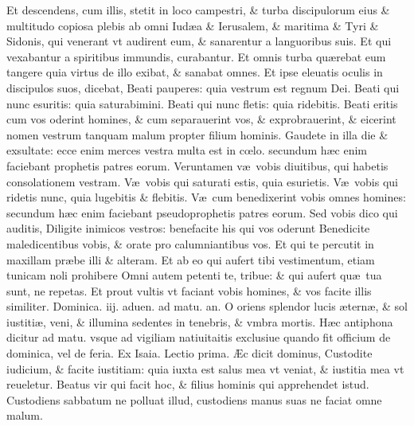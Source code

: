 \documentclass[a5paper,10pt]{book}
\def\leftmarginnote{%
	\lrmarginnote{\hskip -\marginparsep \hskip -6.5em}}
\def\ae{æ}
\def\AE{Æ}
\def\oe{œ}
\begin{document}
\begin{multicols*}{2}
Et descendens, cum illis, stetit in loco campestri, \& turba discipulorum eius \& multitudo copiosa plebis ab omni Iud\ae a \& Ierusalem, \& maritima \& Tyri \& Sidonis, qui venerant vt audirent eum, \& sanarentur a languoribus suis.
Et qui vexabantur a spiritibus immundis, curabantur. Et omnis turba qu\ae rebat eum tangere quia virtus de illo exibat, \& sanabat omnes.
Et ipse eleuatis oculis in discipulos suos, dicebat, Beati pauperes: quia vestrum est regnum Dei.
Beati qui nunc esuritis: quia saturabimini.
Beati qui nunc fletis: quia ridebitis.
Beati eritis cum vos oderint homines, \& cum separauerint vos, \& exprobrauerint, \& eicerint nomen vestrum tanquam malum propter filium hominis.
Gaudete in illa die \& exsultate: ecce enim merces vestra multa est in c\oe lo. secundum h\ae c enim faciebant prophetis patres eorum.
Veruntamen v\ae \ vobis diuitibus,
qui habetis consolationem vestram.
V\ae \ vobis qui saturati estis, quia esurietis.
V\ae \ vobis qui ridetis nunc, quia lugebitis \& flebitis.
V\ae \ cum benedixerint vobis omnes homines: secundum h\ae c enim faciebant pseudoprophetis patres eorum.
Sed vobis dico qui auditis, Diligite inimicos vestros: benefacite his qui vos oderunt Benedicite maledicentibus vobis, \& orate pro calumniantibus vos.
Et qui te percutit in maxillam pr\ae be illi \& alteram.
Et ab eo qui aufert tibi vestimentum, etiam tunicam noli prohibere Omni autem petenti te, tribue: \& qui aufert qu\ae \ tua sunt, ne repetas.
Et prout vultis vt faciant vobis homines, \& vos facite illis similiter.
\newline {} \color{red} \hypertarget{SUN-TERTIA-ADV}{Dominica. iij. aduen.} ad matu. an. \color{black} O oriens splendor lucis \ae tern\ae , \& sol iustiti\ae , veni, \& illumina sedentes in tenebris, \& vmbra mortis.
\newline \color{red} H\ae c antiphona dicitur ad matu. vsque ad vigiliam natiuitaitis exclusiue quando fit officium de dominica, vel de feria. \color{black}
\newline {} \color{red} Ex Isaia. \hfill Lectio prima. \color{black}
\vspace{-1.25em}
\AE c\leftmarginnote{\begin{flushright}c. 56.\end{flushright}} dicit dominus, Custodite iudicium, \& facite iustitiam: quia iuxta est salus mea vt veniat, \& iustitia mea vt reueletur.
Beatus vir qui facit hoc, \& filius hominis qui apprehendet istud.
Custodiens sabbatum ne polluat illud, custodiens manus suas ne faciat omne malum.

\end{multicols*}
\end{document}
